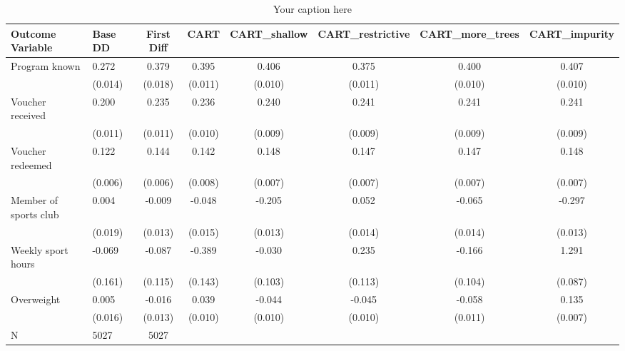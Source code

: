 \begin{sidewaystable*}
\centering
\begin{tabular}{llcccccc}
\hline
Outcome Variable & Base DD & First Diff & CART & CART_shallow & CART_restrictive & CART_more_trees & CART_impurity \\
\hline
Program known & 0.272 & 0.379 & 0.395 & 0.406 & 0.375 & 0.400 & 0.407 \\
  & (0.014) & (0.018) & (0.011) & (0.010) & (0.011) & (0.010) & (0.010) \\
Voucher received & 0.200 & 0.235 & 0.236 & 0.240 & 0.241 & 0.241 & 0.241 \\
  & (0.011) & (0.011) & (0.010) & (0.009) & (0.009) & (0.009) & (0.009) \\
Voucher redeemed & 0.122 & 0.144 & 0.142 & 0.148 & 0.147 & 0.147 & 0.148 \\
  & (0.006) & (0.006) & (0.008) & (0.007) & (0.007) & (0.007) & (0.007) \\
Member of sports club & 0.004 & -0.009 & -0.048 & -0.205 & 0.052 & -0.065 & -0.297 \\
  & (0.019) & (0.013) & (0.015) & (0.013) & (0.014) & (0.014) & (0.013) \\
Weekly sport hours & -0.069 & -0.087 & -0.389 & -0.030 & 0.235 & -0.166 & 1.291 \\
  & (0.161) & (0.115) & (0.143) & (0.103) & (0.113) & (0.104) & (0.087) \\
Overweight & 0.005 & -0.016 & 0.039 & -0.044 & -0.045 & -0.058 & 0.135 \\
  & (0.016) & (0.013) & (0.010) & (0.010) & (0.010) & (0.011) & (0.007) \\
\hline
N & 5027 & 5027  &  &  &  &  \\
\hline
\end{tabular}
\caption{Your caption here}
\label{tab:your_label}
\end{sidewaystable*}